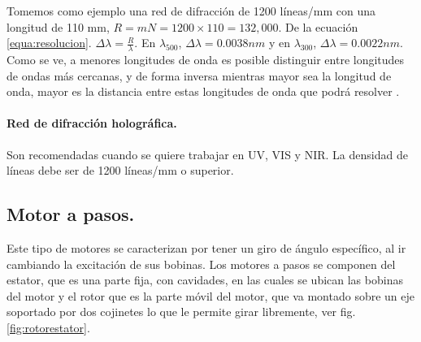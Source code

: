 Tomemos como ejemplo una red de difracción de 1200 líneas/mm con una longitud de 110 mm, $R=mN = 1200 \times 110 = 132,000$. De la ecuación \ref{equa:resolucion}. $\Delta\lambda = \frac{R}{\lambda}$. En $\lambda_{500}$, $\Delta\lambda = 0.0038nm$
y en $\lambda_{300}$, $\Delta\lambda = 0.0022nm$. Como se ve, a menores longitudes de onda es posible distinguir entre longitudes de ondas más cercanas, y de forma inversa mientras mayor sea la longitud de onda, mayor es la distancia entre estas longitudes de onda que podrá resolver \cite{Gratings2008}.

\paragraph{Red de difracción holográfica.} Son recomendadas cuando se quiere trabajar en UV, VIS y NIR. La densidad de líneas debe ser de 1200 líneas/mm o superior. %





\subsection{Motor a pasos.}
Este tipo de motores se caracterizan por tener un giro de ángulo específico, al ir cambiando la excitación de sus bobinas. %
Los motores a pasos se componen del estator, que es una parte fija, con cavidades, en las cuales se ubican las bobinas del motor y el rotor que es la parte móvil del motor, que va montado sobre un eje soportado por dos cojinetes lo que le permite girar libremente, ver fig. \ref{fig:rotorestator}. 

